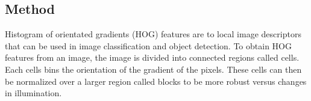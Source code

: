 \subsection{Method}
\label{subsec:pageclasmethod}
Histogram of orientated gradients (HOG) features are
to local image descriptors that can be used in image classification and object
detection\cite{dalal2005histograms}. To obtain HOG features from an image, the
image is divided into connected regions called cells. Each cells bins the
orientation of the gradient of the pixels. These cells can then be normalized
over a larger region called blocks to be more robust versus changes in
illumination.






